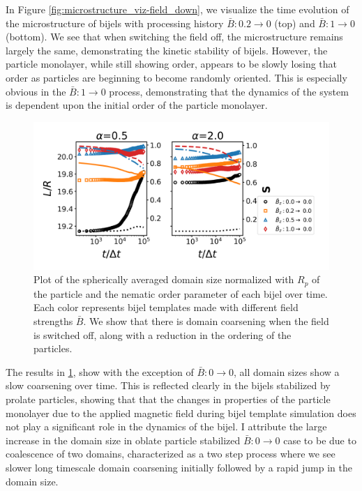 In Figure \ref{fig:microstructure_viz-field_down}, we visualize the time
evolution of the microstructure of bijels with processing history
$\bar{B}:0.2 \rightarrow 0$ (top) and $\bar{B}:1 \rightarrow 0$
(bottom). We see that when switching the field off, the microstructure
remains largely the same, demonstrating the kinetic stability of bijels.
However, the particle monolayer, while still showing order, appears to
be slowly losing that order as particles are beginning to become
randomly oriented. This is especially obvious in the
$\bar{B}:1 \rightarrow 0$ process, demonstrating that the dynamics of
the system is dependent upon the initial order of the particle
monolayer.

\begin{figure} 
\centering 
\includegraphics[scale=0.5]{../figures/results/paper2/domain_size-field_down.png} 
\caption{Plot of the spherically averaged domain size normalized with $R_p$ of the particle and the nematic order parameter of each bijel over time. 
         Each color represents bijel templates made with different field strengths $\bar{B}$. We show that there is domain coarsening when the field 
         is switched off, along with a reduction in the ordering of the particles.} 
\label{fig:domain_size-field_down} 
\end{figure}

The results in \ref{fig:domain_size-field_down}, show with the exception of $\bar{B}:0\rightarrow0$, all
domain sizes show a slow coarsening over time. This is reflected clearly
in the bijels stabilized by prolate particles, showing that that the
changes in properties of the particle monolayer due to the applied
magnetic field during bijel template simulation does not play a
significant role in the dynamics of the bijel. I attribute the large
increase in the domain size in oblate particle stabilized
$\bar{B}:0\rightarrow0$ case to be due to coalescence of two
domains, characterized as a two step process where we see slower long
timescale domain coarsening initially followed by a rapid jump in the
domain size.

